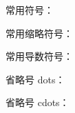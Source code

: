 \documentclass[a5paper,12pt]{ctexart}
\begin{document}
常用符号： 

常用缩略符号： 

常用导数符号： 

省略号 dots： 

省略号 cdots： 
\end{document}
